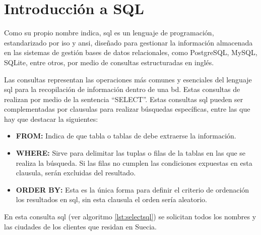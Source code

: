 \section{Introducción a SQL}

Como su propio nombre indica, \acrfull{sql} es un lenguaje de programación, estandarizado por \acrshort{iso}\cite{ISO} y \acrshort{ansi}\cite{ANSI}, diseñado para gestionar la información almacenada en las sistemas de gestión bases de datos relacionales, como PostgreSQL\cite{PostgreSQL}, MySQL\cite{MySQL}, SQLite\cite{SQLite}, entre otros, por medio de consultas estructuradas en inglés.

Las consultas representan las operaciones más comunes y esenciales del lenguaje \acrshort{sql} para la recopilación de información dentro de una \acrshort{bd}. Estas consultas de realizan por medio de la sentencia ``SELECT''. Estas consultas \acrshort{sql} pueden ser complementadas por clausulas para realizar búsquedas específicas, entre las que hay que destacar la siguientes:

\begin{itemize}
	\item \textbf{FROM:} Indica de que tabla o tablas de debe extraerse la información.
	\item \textbf{WHERE:} Sirve para delimitar las tuplas o filas de la tablas en las que se realiza la búsqueda. Si las filas no cumplen las condiciones expuestas en esta clausula, serán excluidas del resultado.
	\item \textbf{ORDER BY:} Esta es la única forma para definir el criterio de ordenación los resultados en \acrshort{sql}, sin esta clausula el orden sería aleatorio.
\end{itemize}



En esta consulta \acrshort{sql} (ver algoritmo \ref{lst:selectsql}) se solicitan todos los nombres y las ciudades de los clientes que residan en Suecia.